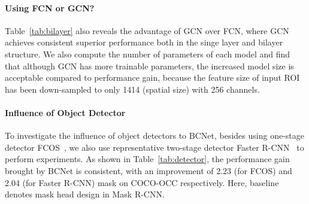 \vspace{-0.1in}
\paragraph{Using FCN or GCN?} Table~\ref{tab:bilayer} also reveals the advantage of GCN over FCN, where GCN achieves consistent superior performance both in the singe layer and bilayer structure.
We also compute the number of parameters of each model and find that although GCN has more trainable parameters, the increased model size is acceptable compared to performance gain, because the feature size of input ROI has been down-sampled to only 1414 (spatial size) with 256 channels.

\begin{table}[!h]
	\caption{Effect of~\textbf{bilayer structure} using \textbf{GCN vs. FCN} implementation.}
\centering
	\vspace{-0.3in}
	\label{tab:bilayer}
\end{table}

\paragraph{Influence of Object Detector} 
To investigate the influence of object detectors to BCNet, besides using one-stage detector FCOS~\cite{tian2019fcos}, we also use representative two-stage detector Faster R-CNN~\cite{ren2015faster} to perform experiments.  As shown in Table~\ref{tab:detector}, the performance gain brought by BCNet is consistent, with an improvement of 2.23 (for FCOS) and 2.04 (for Faster R-CNN) mask  on COCO-OCC respectively. Here, baseline denotes mask head design in Mask R-CNN.

